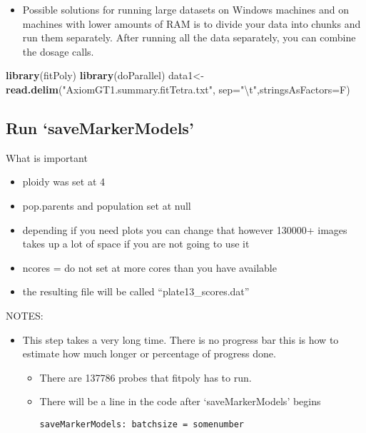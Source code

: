 \documentclass[
]{article}
\newenvironment{Shaded}{\begin{snugshade}}{\end{snugshade}}
\newcommand{\CharTok}[1]{\textcolor[rgb]{0.31,0.60,0.02}{#1}}
\newcommand{\DataTypeTok}[1]{\textcolor[rgb]{0.13,0.29,0.53}{#1}}
\newcommand{\KeywordTok}[1]{\textcolor[rgb]{0.13,0.29,0.53}{\textbf{#1}}}
\newcommand{\NormalTok}[1]{#1}
\newcommand{\StringTok}[1]{\textcolor[rgb]{0.31,0.60,0.02}{#1}}
\providecommand{\tightlist}{%
  \setlength{\itemsep}{0pt}\setlength{\parskip}{0pt}}
\begin{document}
\begin{itemize}
\tightlist
\item
  Possible solutions for running large datasets on Windows machines and
  on machines with lower amounts of RAM is to divide your data into
  chunks and run them separately. After running all the data separately,
  you can combine the dosage calls.
\end{itemize}

\begin{Shaded}
\begin{Highlighting}[]
\KeywordTok{library}\NormalTok{(fitPoly)}
\KeywordTok{library}\NormalTok{(doParallel)}
\NormalTok{data1<-}\KeywordTok{read.delim}\NormalTok{(}\StringTok{"AxiomGT1.summary.fitTetra.txt"}\NormalTok{,}
                 \DataTypeTok{sep=}\StringTok{"}\CharTok{\textbackslash{}t}\StringTok{"}\NormalTok{,}\DataTypeTok{stringsAsFactors=}\NormalTok{F)}
\end{Highlighting}
\end{Shaded}

\hypertarget{run-savemarkermodels}{%
\subsection{Run `saveMarkerModels'}\label{run-savemarkermodels}}

What is important

\begin{itemize}
\item
  ploidy was set at 4
\item
  pop.parents and population set at null
\item
  depending if you need plots you can change that however 130000+ images
  takes up a lot of space if you are not going to use it
\item
  ncores = do not set at more cores than you have available
\item
  the resulting file will be called ``plate13\_scores.dat''
\end{itemize}

NOTES:

\begin{itemize}
\item
  This step takes a very long time. There is no progress bar this is how
  to estimate how much longer or percentage of progress done.

  \begin{itemize}
  \item
    There are 137786 probes that fitpoly has to run.
  \item
    There will be a line in the code after `saveMarkerModels' begins

\begin{verbatim}
saveMarkerModels: batchsize = somenumber
\end{verbatim}
  \end{itemize}
\end{itemize}
\end{document}
